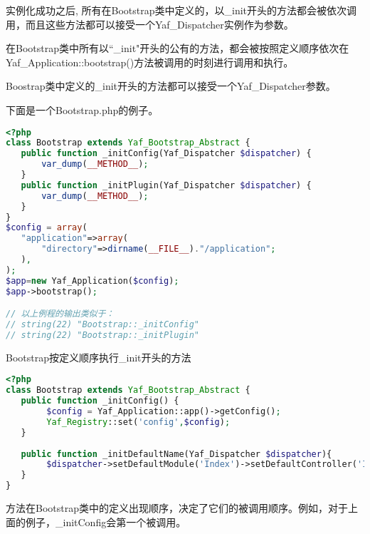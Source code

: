 实例化成功之后, 所有在Bootstrap类中定义的，以\_init开头的方法都会被依次调用，而且这些方法都可以接受一个Yaf\_Dispatcher实例作为参数。

在Bootstrap类中所有以``\_init"开头的公有的方法，都会被按照定义顺序依次在Yaf\_Application::bootstrap()方法被调用的时刻进行调用和执行。

Boostrap类中定义的\_init开头的方法都可以接受一个Yaf\_Dispatcher参数。

下面是一个Bootstrap.php的例子。

\begin{lstlisting}[language=PHP]
<?php
class Bootstrap extends Yaf_Bootstrap_Abstract {
   public function _initConfig(Yaf_Dispatcher $dispatcher) {
       var_dump(__METHOD__);
   }
   public function _initPlugin(Yaf_Dispatcher $dispatcher) {
       var_dump(__METHOD__);
   }
}
$config = array(
   "application"=>array(
       "directory"=>dirname(__FILE__)."/application";
   ),
);
$app=new Yaf_Application($config);
$app->bootstrap();

// 以上例程的输出类似于：
// string(22) "Bootstrap::_initConfig"
// string(22) "Bootstrap::_initPlugin"
\end{lstlisting}

\begin{example}
Bootstrap按定义顺序执行\_init开头的方法
\begin{lstlisting}[language=PHP]
<?php
class Bootstrap extends Yaf_Bootstrap_Abstract {
   public function _initConfig() {
        $config = Yaf_Application::app()->getConfig();
        Yaf_Registry::set('config',$config);
   }
   
   public function _initDefaultName(Yaf_Dispatcher $dispatcher){
        $dispatcher->setDefaultModule('Index')->setDefaultController('Index')->setDefaultAction('index');
   }
}
\end{lstlisting}
\end{example}


方法在Bootstrap类中的定义出现顺序，决定了它们的被调用顺序。例如，对于上面的例子，\_initConfig会第一个被调用。


